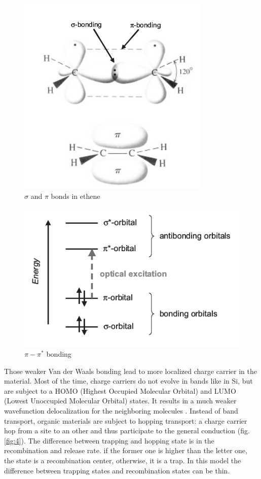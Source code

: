 \begin{figure}
    \centering
    \includegraphics*[width=0.4\paperwidth]{figures/pi_bonding.png}
    \caption{$\sigma$ and $\pi$ bonds in ethene \label{fig:2} \cite{intro_orga}}
\end{figure}

\begin{figure}
    \centering
    \includegraphics*[width=0.4\paperwidth]{figures/pi_pistar.png}
    \caption{$\pi-\pi^*$ bonding \label{fig:3} \cite{intro_orga}}
\end{figure}

Those weaker Van der Waals bonding lead to more localized charge carrier in the material. Most of the time, charge carriers do not evolve in bands like in Si, but are subject to a HOMO (Highest Occupied Molecular Orbital) and LUMO (Lowest Unoccupied Molecular Orbital) states. It results in a much weaker wavefunction delocalization for the neighboring molecules \cite{intro_orga}. Instead of band transport, organic materials are subject to hopping transport: a charge carrier hop from a site to an other and thus participate to the general conduction (fig.\ref{fig:4}). The difference between trapping and hopping state is in the recombination and release rate. if the former one is higher than the letter one, the state is a recombination center, otherwise, it is a trap. In this model the difference between trapping states and recombination states can be thin.


